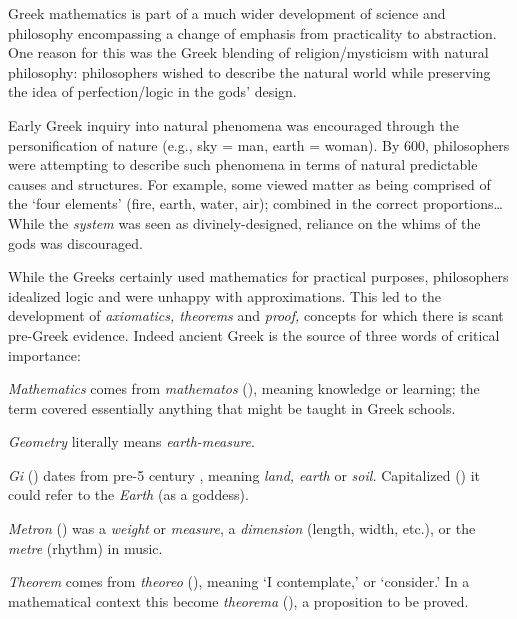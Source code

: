 Greek mathematics is part of a much wider development of science and philosophy encompassing a change of emphasis from practicality to abstraction. One reason for this was the Greek blending of religion/mysticism with natural philosophy: philosophers wished to describe the natural world while preserving the idea of perfection/logic in the gods' design.\smallbreak

Early Greek inquiry into natural phenomena was encouraged through the personification of nature (e.g., sky = man, earth = woman). By 600\BC, philosophers were attempting to describe such phenomena in terms of natural predictable causes and structures. For example, some viewed matter as being comprised of the `four elements' (fire, earth, water, air); combined in the correct proportions\ldots While the \emph{system} was seen as divinely-designed, reliance on the whims of the gods was discouraged.\smallbreak

While the Greeks certainly used mathematics for practical purposes, philosophers idealized logic and were unhappy with approximations. This led to the development of \emph{axiomatics, theorems} and \emph{proof,} concepts for which there is scant pre-Greek evidence. Indeed ancient Greek is the source of three words of critical importance:\vspace{-3pt}
\begin{description}\itemsep0pt
	\item[]\emph{Mathematics} comes from \emph{mathematos} (), meaning knowledge or learning; the term covered essentially anything that might be taught in Greek schools.
	\item[]\emph{Geometry} literally means \emph{earth-measure}.\vspace{-6pt}
	\begin{description}\itemsep0pt
	\item[]\emph{Gi} () dates from pre-5\th{} century \!\BC{}, meaning \emph{land, earth} or \emph{soil.} Capitalized () it could refer to the \emph{Earth} (as a goddess).
	\item[]\emph{Metron} () was a \emph{weight} or \emph{measure}, a \emph{dimension}  (length, width, etc.), or the \emph{metre} (rhythm) in music.
	\end{description}\vspace{-6pt}
	\item[]\emph{Theorem} comes from \emph{theoreo} (), meaning `I contemplate,' or `consider.' In a mathematical context this become \emph{theorema} (), a proposition to be proved.
\end{description}

